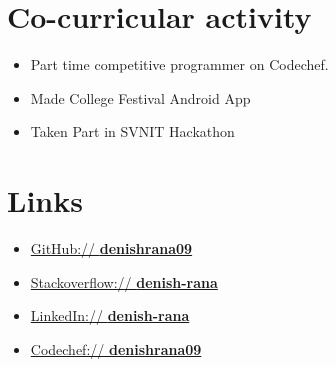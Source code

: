 \documentclass[11pt,a4paper,sans]{moderncv}        %
\begin{document}
\section{Co-curricular activity}

\vspace{6pt}

\begin{itemize}

\item{Part time competitive programmer on Codechef.}

\vspace{4pt}

\item{Made College Festival Android App }\vspace{6pt}

\item{Taken Part in SVNIT Hackathon }\vspace{6pt}

\end{itemize}


\section{Links}

\vspace{6pt}
 
\begin{itemize}

\item{\href{https://github.com/denishrana09}{GitHub:// \textbf{denishrana09}}}\vspace{4pt}
\item \href{https://stackoverflow.com/users/8018480/denish-rana}{Stackoverflow:// \textbf{denish-rana}}\vspace{4pt}
\item \href{https://www.linkedin.com/in/denish-rana/}{LinkedIn:// \textbf{denish-rana}}\vspace{6pt}
\item \href{https://www.codechef.com/users/denishrana09}{Codechef:// \textbf{denishrana09}}\vspace{4pt}

\end{itemize}

\nocite{*}

\end{document}
